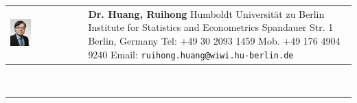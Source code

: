 \documentclass[a4paper,10pt]{article}
\begin{document}
\newcommand{\HU}[0]{Humboldt Universit\"at zu Berlin}
\fancyhf{}
\renewcommand{\headrulewidth}{0pt}
\renewcommand{\footrulewidth}{1pt}
\renewcommand\footrule{\begin{minipage}{1\textwidth}
\hrule width \hsize height 2pt \kern 1mm \hrule width \hsize   
\end{minipage}\par}
\pagestyle{fancy}
\begin{tabular}[h]{p{}p{}}
  \vfill\hspace{-10pt}\includegraphics[width=0.3\textwidth]{bew/ruihong_2013.jpg} &\vspace{1pt}\large{\textbf{Dr. Huang, Ruihong}\newline 
Humboldt Universit\"at zu Berlin \newline 
Institute for Statistics and Econometrics  ­\newline
Spandauer Str. 1  \newline
10178 Berlin, Germany \newline
Tel: +49 30 2093 1459 \newline
Mob. +49 176 4904 9240 \newline
Email: \verb|ruihong.huang@wiwi.hu-berlin.de| } \\
\end{tabular}\\
\rule[5pt]{1\textwidth}{1pt}\par
\setlength{\tabcolsep}{10pt}
\setlength{\extrarowheight}{6pt}
\end{document}
